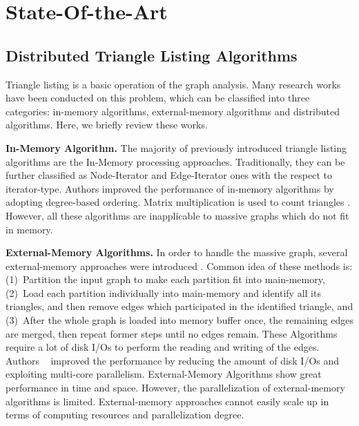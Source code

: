 \section{State-Of-the-Art}
\label{sec:state-of-the-art}
\subsection{Distributed Triangle Listing Algorithms}
Triangle listing is a basic operation of the graph analysis. Many research works have been conducted on this problem, which can be classified into three categories: in-memory algorithms, external-memory algorithms and distributed algorithms. Here, we briefly review these works. 

\hspace{-1em}\textbf{In-Memory Algorithm.} 
The majority of previously introduced triangle listing algorithms are the In-Memory processing approaches. Traditionally, they can be further classified as Node-Iterator\cite{Alon_Yuster_Zwick_1997,Batagelj_Mrvar_2001,Schank_2007} and Edge-Iterator ones\cite{
Itai_Rodeh_1978,Chiba_Nishizeki_1985} with the respect to iterator-type. Authors \cite{Itai_Rodeh_1978,Chiba_Nishizeki_1985,Schank_2007}improved the performance of in-memory algorithms by adopting degree-based ordering. 
Matrix multiplication is used to count triangles \cite{Alon_Yuster_Zwick_1997}. However, all these algorithms are inapplicable to massive graphs which do not fit in memory. 

\hspace{-1em}\textbf{External-Memory Algorithms.} In order to handle the massive graph, several external-memory approaches were introduced \cite{H14,Kim_Han_Lee_Park_Yu_2014,GraphChi}. Common idea of these methods is: (1)~Partition the input graph to make each partition fit into main-memory, (2)~Load each partition individually into main-memory and identify all its triangles, and then remove edges which participated in the identified triangle, and (3)~After the whole graph is loaded into memory buffer once, the remaining edges are merged, then repeat former steps until no edges remain. These Algorithms require a lot of disk I/Os to perform the reading and writing of the edges. 
Authors ~\cite{H14,Kim_Han_Lee_Park_Yu_2014} improved the performance by reducing the amount of disk I/Os and exploiting multi-core parallelism. External-Memory Algorithms show great performance in time and space. However, the parallelization of external-memory algorithms is limited. External-memory approaches cannot easily scale up in terms of computing resources and parallelization degree.

